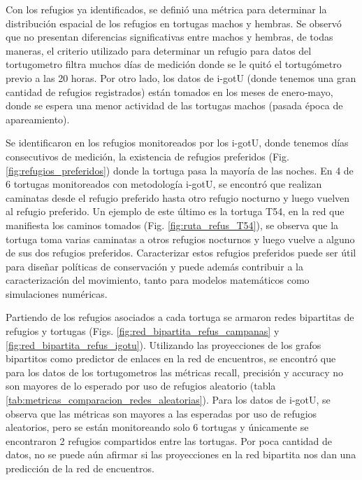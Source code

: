 Con los refugios ya identificados, se definió una métrica para determinar la distribución espacial de los refugios en tortugas machos y hembras. Se observó que no presentan diferencias significativas entre machos y hembras, de todas maneras, el criterio utilizado para determinar un refugio para datos del tortugometro filtra muchos días de medición donde se le quitó el tortugómetro previo a las 20 horas. Por otro lado, los datos de i-gotU (donde tenemos una gran cantidad de refugios registrados) están tomados en los meses de enero-mayo, donde se espera una menor actividad de las tortugas machos (pasada época de apareamiento)\cite{Erika}.
 
Se identificaron en los refugios monitoreados por los i-gotU, donde tenemos días consecutivos de medición, la existencia de refugios preferidos (Fig. \ref{fig:refugios_preferidos}) donde la tortuga pasa la mayoría de las noches. En 4 de 6 tortugas monitoreados con metodología i-gotU, se encontró que realizan caminatas desde el refugio preferido hasta otro refugio nocturno y luego vuelven al refugio preferido. Un ejemplo de este último es la tortuga T54, en la red que manifiesta los caminos tomados (Fig. \ref{fig:ruta_refus_T54}), se observa que la tortuga  toma varias caminatas a otros refugios nocturnos y luego vuelve a alguno de sus dos refugios preferidos. Caracterizar estos refugios preferidos puede ser útil para diseñar políticas de conservación y puede además contribuir a la caracterización del movimiento, tanto para modelos matemáticos como  simulaciones numéricas.
 
Partiendo de los refugios asociados a cada tortuga se armaron redes bipartitas de refugios y tortugas (Figs. \ref{fig:red_bipartita_refus_campanas} y \ref{fig:red_bipartita_refus_igotu}). Utilizando las proyecciones de los grafos bipartitos como predictor de enlaces en la red de encuentros, se encontró que para los datos de los tortugometros las métricas recall, precisión y accuracy no son mayores de lo esperado por  uso de refugios aleatorio (tabla \ref{tab:metricas_comparacion_redes_aleatorias}). Para los datos de i-gotU, se observa que las métricas son mayores a las esperadas por uso  de refugios aleatorios,  pero  se están monitoreando solo 6 tortugas y únicamente se encontraron 2 refugios compartidos entre las tortugas. Por  poca cantidad de datos, no se puede aún afirmar si las proyecciones en la red bipartita nos dan una predicción de la red de encuentros.
 

